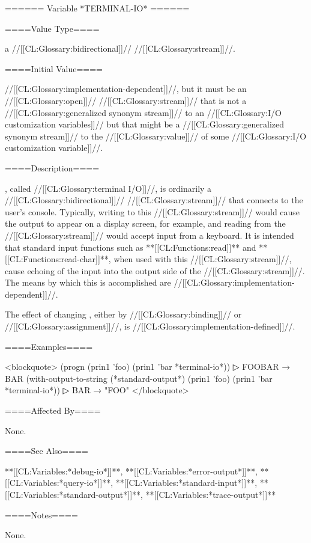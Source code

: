 ====== Variable *TERMINAL-IO* ======

====Value Type====

a //[[CL:Glossary:bidirectional]]// //[[CL:Glossary:stream]]//.

====Initial Value====

//[[CL:Glossary:implementation-dependent]]//, but it must be an //[[CL:Glossary:open]]// //[[CL:Glossary:stream]]// that is not a //[[CL:Glossary:generalized synonym stream]]// to an //[[CL:Glossary:I/O customization variables]]// but that might be a //[[CL:Glossary:generalized synonym stream]]// to the //[[CL:Glossary:value]]// of some //[[CL:Glossary:I/O customization variable]]//.

====Description====

, called //[[CL:Glossary:terminal I/O]]//, is ordinarily a //[[CL:Glossary:bidirectional]]// //[[CL:Glossary:stream]]// that connects to the user's console. Typically, writing to this //[[CL:Glossary:stream]]// would cause the output to appear on a display screen, for example, and reading from the //[[CL:Glossary:stream]]// would accept input from a keyboard. It is intended that standard input functions such as **[[CL:Functions:read]]** and **[[CL:Functions:read-char]]**, when used with this //[[CL:Glossary:stream]]//, cause echoing of the input into the output side of the //[[CL:Glossary:stream]]//. The means by which this is accomplished are //[[CL:Glossary:implementation-dependent]]//.

The effect of changing , either by //[[CL:Glossary:binding]]// or //[[CL:Glossary:assignment]]//, is //[[CL:Glossary:implementation-defined]]//.

====Examples====

<blockquote> (progn (prin1 'foo) (prin1 'bar *terminal-io*))
▷ FOOBAR → BAR (with-output-to-string (*standard-output*) (prin1 'foo) (prin1 'bar *terminal-io*))
▷ BAR → "FOO" </blockquote>

====Affected By====

None.

====See Also====

**[[CL:Variables:*debug-io*]]**, **[[CL:Variables:*error-output*]]**, **[[CL:Variables:*query-io*]]**, **[[CL:Variables:*standard-input*]]**, **[[CL:Variables:*standard-output*]]**, **[[CL:Variables:*trace-output*]]**

====Notes====

None.

